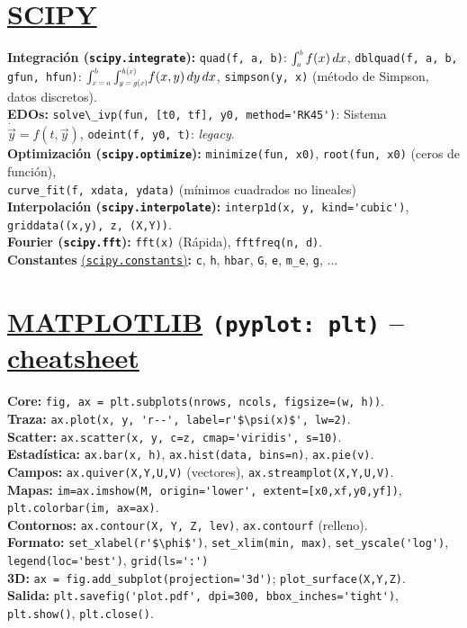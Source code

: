 \section{\href{https://scipy.org/}{SCIPY} }
\textbf{Integración (\texttt{scipy.integrate}):}
\texttt{quad(f, a, b)}:
$\int_{\scalebox{0.6}{$a$}}^{\scalebox{0.6}{$b$}} f(x)\,dx$, \texttt{dblquad(f, a, b, gfun, hfun)}: $\int_{\scalebox{0.6}{$x=a$}}^{\scalebox{0.6}{$b$}}\int_{\scalebox{0.6}{$y=g(x)$}}^{\scalebox{0.6}{$h(x)$}}\!f(x,y)\,dy\,dx$, \texttt{simpson(y, x)} (método de Simpson, datos discretos). \\
\textbf{EDOs:}
\verb|solve\_ivp(fun, [t0, tf], y0, method='RK45')|: Sistema $\dot{\vec{y}} = f(t, \vec{y})$, \texttt{odeint(f, y0, t)}: \textit{legacy}. \\
\textbf{Optimización (\texttt{scipy.optimize}):} \texttt{minimize(fun, x0)}, 
\texttt{root(fun, x0)} (ceros de función), \\
\texttt{curve\_fit(f, xdata, ydata)} (mínimos cuadrados no lineales) \\
\textbf{Interpolación (\texttt{scipy.interpolate}):}
\verb|interp1d(x, y, kind='cubic')|,
\texttt{griddata((x,y), z, (X,Y))}.\\
\textbf{Fourier (\texttt{scipy.fft}):} \texttt{fft(x)} (Rápida), \texttt{fftfreq(n, d)}. \\
\textbf{Constantes}
\href{https://docs.scipy.org/doc/scipy/reference/constants.html}{(\texttt{scipy.constants})}\textbf{:} \texttt{c}, \texttt{h}, \texttt{hbar}, \texttt{G}, \texttt{e}, \texttt{m\_e}, \texttt{g}, ...

\section{\href{https://matplotlib.org/}{MATPLOTLIB} \texttt{(pyplot: plt)} -- \href{https://matplotlib.org/cheatsheets/cheatsheets.pdf}{cheatsheet}}
\textbf{Core:} \texttt{fig, ax = plt.subplots(nrows, ncols, figsize=(w, h))}. \\
\textbf{Traza:} \verb|ax.plot(x, y, 'r--', label=r'$\psi(x)$', lw=2)|. \\
\textbf{Scatter:} \verb|ax.scatter(x, y, c=z, cmap='viridis', s=10)|. \\
\textbf{Estadística:} \texttt{ax.bar(x, h)}, \texttt{ax.hist(data, bins=n)}, \texttt{ax.pie(v)}. \\
\textbf{Campos:} \texttt{ax.quiver(X,Y,U,V)} (vectores), \texttt{ax.streamplot(X,Y,U,V)}. \\
\textbf{Mapas:} \verb|im=ax.imshow(M, origin='lower', extent=[x0,xf,y0,yf])|, \texttt{plt.colorbar(im, ax=ax)}. \\
\textbf{Contornos:} \texttt{ax.contour(X, Y, Z, lev)}, \texttt{ax.contourf} (relleno). \\
\textbf{Formato:} \verb|set_xlabel(r'$\phi$')|, \texttt{set\_xlim(min, max)}, \verb|set_yscale('log')|, \verb|legend(loc='best')|, \verb|grid(ls=':')|\\
\textbf{3D:} \verb|ax = fig.add_subplot(projection='3d')|; \texttt{plot\_surface(X,Y,Z)}. \\
\textbf{Salida:} \verb|plt.savefig('plot.pdf', dpi=300, bbox_inches='tight')|, \texttt{plt.show()}, \texttt{plt.close()}.

